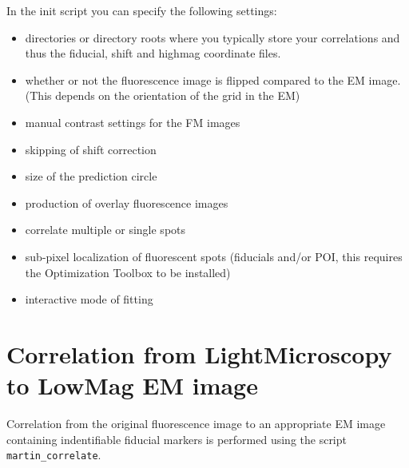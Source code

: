 \documentclass[10pt,a4paper,onepage,DIV12]{scrartcl}
\begin{document}
In the init script you can specify the following settings:
\begin{itemize}
 \item directories or directory roots where you typically store your correlations and thus the fiducial, shift and highmag coordinate files.
 \item whether or not the fluorescence image is flipped compared to the EM image. (This depends on the orientation of the grid in the EM)
 \item manual contrast settings for the FM images
 \item skipping of shift correction
 \item size of the prediction circle
 \item production of overlay fluorescence images
 \item correlate multiple or single spots
 \item sub-pixel localization of fluorescent spots (fiducials and/or POI, this requires the Optimization Toolbox to be installed)
 \item interactive mode of fitting
\end{itemize}


\newpage
 
\newpage
\section{Correlation from LightMicroscopy to LowMag EM image}

Correlation from the original fluorescence image to an appropriate EM image containing indentifiable fiducial markers is performed using the script \texttt{martin\_correlate}.
\end{document}
